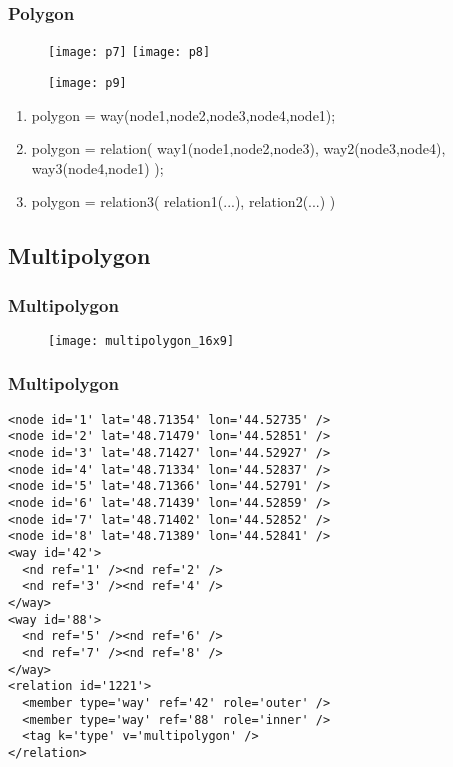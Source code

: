 \begin{frame}
    \frametitle{Polygon}
    \begin{figure}[ht!]
        \texttt{[image: p7]}
        \texttt{[image: p8]}
    \end{figure}
    \begin{minipage}[h]{0.49\textwidth}
        \begin{figure}[ht!]
            \texttt{[image: p9]}
        \end{figure}
    \end{minipage}
    \scriptsize
    \begin{minipage}[h]{0.49\textwidth}
        \begin{enumerate}
            \item polygon = way(node1,node2,node3,node4,node1);
            \item polygon = relation( way1(node1,node2,node3), 
                way2(node3,node4), way3(node4,node1) );
            \item polygon = relation3( relation1(...), relation2(...) )
        \end{enumerate}
    \end{minipage}
\end{frame}

\subsection{Multipolygon}
\begin{frame}
    \frametitle{Multipolygon}
    \begin{figure}[ht!]
        \texttt{[image: multipolygon\_16x9]}
    \end{figure}
\end{frame}

\begin{frame}[fragile]
    \frametitle{Multipolygon}
    \begin{lstlisting}
<node id='1' lat='48.71354' lon='44.52735' />
<node id='2' lat='48.71479' lon='44.52851' />
<node id='3' lat='48.71427' lon='44.52927' />
<node id='4' lat='48.71334' lon='44.52837' />
<node id='5' lat='48.71366' lon='44.52791' />
<node id='6' lat='48.71439' lon='44.52859' />
<node id='7' lat='48.71402' lon='44.52852' />
<node id='8' lat='48.71389' lon='44.52841' />
<way id='42'>
  <nd ref='1' /><nd ref='2' />
  <nd ref='3' /><nd ref='4' />
</way>
<way id='88'>
  <nd ref='5' /><nd ref='6' />
  <nd ref='7' /><nd ref='8' />
</way>
<relation id='1221'>
  <member type='way' ref='42' role='outer' />
  <member type='way' ref='88' role='inner' />
  <tag k='type' v='multipolygon' />
</relation>
    \end{lstlisting}
\end{frame}


